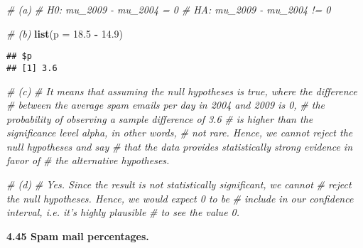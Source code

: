 \documentclass[]{book}
\newenvironment{Shaded}{\begin{snugshade}}{\end{snugshade}}
\newcommand{\CommentTok}[1]{\textcolor[rgb]{0.56,0.35,0.01}{\textit{#1}}}
\newcommand{\DataTypeTok}[1]{\textcolor[rgb]{0.13,0.29,0.53}{#1}}
\newcommand{\FloatTok}[1]{\textcolor[rgb]{0.00,0.00,0.81}{#1}}
\newcommand{\KeywordTok}[1]{\textcolor[rgb]{0.13,0.29,0.53}{\textbf{#1}}}
\newcommand{\NormalTok}[1]{#1}
\newcommand{\OperatorTok}[1]{\textcolor[rgb]{0.81,0.36,0.00}{\textbf{#1}}}
\newcommand{\StringTok}[1]{\textcolor[rgb]{0.31,0.60,0.02}{#1}}
\begin{document}
\begin{Shaded}
\begin{Highlighting}[]
\CommentTok{# (a)}
\CommentTok{# H0: mu_2009 - mu_2004 = 0}
\CommentTok{# HA: mu_2009 - mu_2004 != 0}
\end{Highlighting}
\end{Shaded}

\begin{Shaded}
\begin{Highlighting}[]
\CommentTok{# (b)}
\KeywordTok{list}\NormalTok{(}\DataTypeTok{p =} \FloatTok{18.5} \OperatorTok{-}\StringTok{ }\FloatTok{14.9}\NormalTok{)}
\end{Highlighting}
\end{Shaded}

\begin{verbatim}
## $p
## [1] 3.6
\end{verbatim}

\begin{Shaded}
\begin{Highlighting}[]
\CommentTok{# (c)}
\CommentTok{# It means that assuming the null hypotheses is true, where the difference}
\CommentTok{# between the average spam emails per day in 2004 and 2009 is 0,}
\CommentTok{# the probability of observing a sample difference of 3.6}
\CommentTok{# is higher than the significance level alpha, in other words, }
\CommentTok{# not rare. Hence, we cannot reject the null hypotheses and say}
\CommentTok{# that the data provides statistically strong evidence in favor of}
\CommentTok{# the alternative hypotheses.}
\end{Highlighting}
\end{Shaded}

\begin{Shaded}
\begin{Highlighting}[]
\CommentTok{# (d)}
\CommentTok{# Yes. Since the result is not statistically significant, we cannot}
\CommentTok{# reject the null hypotheses. Hence, we would expect 0 to be }
\CommentTok{# include in our confidence interval, i.e. it's highly plausible}
\CommentTok{# to see the value 0.}
\end{Highlighting}
\end{Shaded}

\textbf{4.45 Spam mail percentages.}
\end{document}
